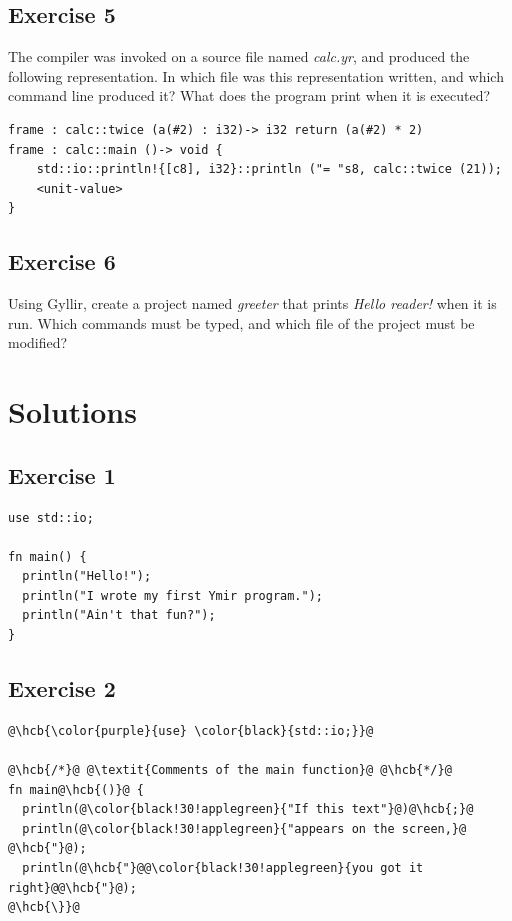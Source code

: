 \subsection*{Exercise 5}

The compiler was invoked on a source file named \textit{calc.yr}, and produced
the following representation. In which file was this representation written, and
which command line produced it? What does the program print when it is executed?

\begin{lstlisting}[style=myilVerb]
frame : calc::twice (a(#2) : i32)-> i32 return (a(#2) * 2)
frame : calc::main ()-> void {
    std::io::println!{[c8], i32}::println ("= "s8, calc::twice (21));
    <unit-value>
}
\end{lstlisting}

\subsection*{Exercise 6}

Using Gyllir, create a project named \textit{greeter} that prints
\textit{Hello reader!} when it is run. Which commands must be typed, and which
file of the project must be modified?

\vfill%
\pagebreak

\forceevenpage{}

\section*{Solutions}
%
\subsection*{Exercise 1}

\begin{lstlisting}[style=coloredverbatim, caption=Solution for exercise 1]
use std::io;

fn main() {
  println("Hello!");
  println("I wrote my first Ymir program.");
  println("Ain't that fun?");
}
\end{lstlisting}

\subsection*{Exercise 2}

\begin{lstlisting}[style=coloredverbatimCorrect, escapechar=@]
@\hcb{\color{purple}{use} \color{black}{std::io;}}@

@\hcb{/*}@ @\textit{Comments of the main function}@ @\hcb{*/}@
fn main@\hcb{()}@ {
  println(@\color{black!30!applegreen}{"If this text"}@)@\hcb{;}@
  println(@\color{black!30!applegreen}{"appears on the screen,}@ @\hcb{"}@);
  println(@\hcb{"}@@\color{black!30!applegreen}{you got it right}@@\hcb{"}@);
@\hcb{\}}@
\end{lstlisting}

